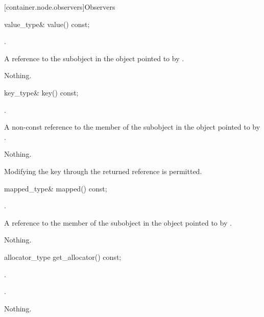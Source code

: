 [container.node.observers]{Observers}

\begin{itemdecl}
value_type& value() const;
\end{itemdecl}

\begin{itemdescr}
\pnum
\requires {}.

\pnum
\returns A reference to the  subobject in the
 object pointed to by .

\pnum
\throws Nothing.
\end{itemdescr}

\begin{itemdecl}
key_type& key() const;
\end{itemdecl}

\begin{itemdescr}
\pnum
\requires {}.

\pnum
\returns A non-const reference to the  member of the
 subobject in the  object
pointed to by .

\pnum
\throws  Nothing.

\pnum
\remarks Modifying the key through the returned reference is permitted.
\end{itemdescr}

\begin{itemdecl}
mapped_type& mapped() const;
\end{itemdecl}

\begin{itemdescr}
\pnum
\requires {}.

\pnum
\returns A reference to the  member of the
 subobject in the  object
pointed to by .

\pnum
\throws  Nothing.
\end{itemdescr}


\begin{itemdecl}
allocator_type get_allocator() const;
\end{itemdecl}

\begin{itemdescr}
\pnum
\requires {}.

\pnum
\returns {}.

\pnum
\throws Nothing.
\end{itemdescr}

